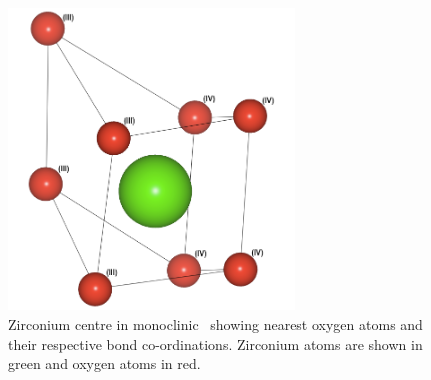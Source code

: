 \begin{figure}[htp] %
\centering
\includegraphics[height=8cm]{images/zr_centre_mono.png}
\caption{Zirconium centre in monoclinic \zirconia\ showing nearest oxygen atoms and their respective bond co-ordinations. Zirconium atoms are shown in green and oxygen atoms in red.}
\label{figure:monoschottky}
\end{figure}

